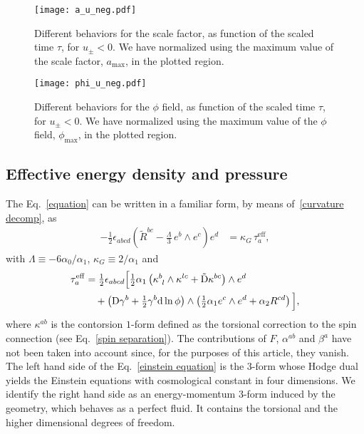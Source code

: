 \documentclass[aps,prd,12pt,superscriptaddress,showpacs,showkeys,longbibliography,reprint,nofootinbib]{revtex4-1}
\begin{document}
\begin{figure}[H]
  \texttt{[image: a\_u\_neg.pdf]}
  \caption{Different behaviors for the scale factor, as function of the scaled time $\tau$, for $u_\pm < 0$. We have normalized using the maximum value of the scale factor, $a_{\mathrm{max}}$, in the plotted region.}
  \label{a_u_neg}
\end{figure}

\begin{figure}[H]
  \texttt{[image: phi\_u\_neg.pdf]}
  \caption{Different behaviors for the $\phi$ field, as function of the scaled time $\tau$, for $u_\pm < 0$. We have normalized using the maximum value of the $\phi$ field, $\phi_{\mathrm{max}}$, in the plotted region.}
  \label{phi_u_neg}
\end{figure}


\subsection{Effective energy density and pressure}

The Eq.~\eqref{equation} can be written in a familiar form, by means of~\eqref{curvature decomp}, as
\begin{align}\label{einstein equation}
  -\frac{1}{2}\epsilon_{abcd}\left(\tilde{R}^{bc} - \frac{\Lambda}{3}\,e^b\wedge e^c\right)e^d &= \kappa_{G}\,\tau^{\mathrm{eff}}_a,
\end{align}
with $\Lambda \equiv -6\alpha_0/\alpha_1$, $\kappa_{G} \equiv 2/\alpha_1$ and 
\begin{align}
  \label{taua}
  \tau_a^{\mathrm{eff}}&= \tfrac{1}{2}\epsilon_{abcd}\Big[\tfrac{1}{2}\alpha_1\left(\kappa^b_{\ l}\wedge\kappa^{lc}+\tilde{\text{D}}\kappa^{bc}\right)\wedge e^d\\
    & \quad +\left(\text{D}\gamma^b+\tfrac{1}{2}\gamma^b\text{d}\ln\phi\right)\wedge\left(\tfrac{1}{2}\alpha_1e^c\wedge e^d+\alpha_2R^{cd}\right)\Big], \notag
\end{align}
where $\kappa^{ab}$ is the contorsion $1$-form defined as the torsional correction to the spin connection (see Eq.~\eqref{spin separation}).
The contributions of $F$, $\alpha^{ab}$ and $\beta^a$ have not been taken into account since, for the purposes of this article, they vanish. The left hand side of the Eq.~\eqref{einstein equation} is the $3$-form whose Hodge dual yields the Einstein equations with cosmological constant in four dimensions.
We identify the right hand side as an energy-momentum $3$-form induced by the geometry, which behaves as a perfect fluid. It contains the torsional and the higher dimensional degrees of freedom.
\end{document}
